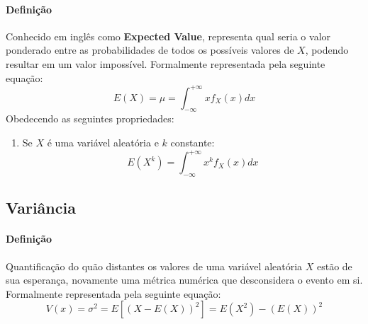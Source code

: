 \documentclass{article}
\begin{document}
            \paragraph{Definição}Conhecido em inglês como \textbf{Expected Value}, representa qual seria o valor ponderado entre as probabilidades de todos os possíveis valores de $X$, podendo resultar em um valor impossível. Formalmente representada pela seguinte equação:
                \begin{equation}
                    \boxed{
                        E(X) = \mu = 
                        \int_{-\infty}^{+\infty} x f_{X}(x) dx
                    }
                \end{equation}
            Obedecendo as seguintes propriedades:
                \begin{enumerate}[rightmargin = \leftmargin, noitemsep]
                    \item Se $X$ é uma variável aleatória e $k$ constante:
                        \begin{equation}
                            \boxed{
                                E(X^{k}) = 
                                \int_{-\infty}^{+\infty} x^{k} f_{X}(x) dx
                            }
                        \end{equation}
                \end{enumerate}

        \subsection{Variância}
            \paragraph{Definição}Quantificação do quão distantes os valores de uma variável aleatória $X$ estão de sua esperança, novamente uma métrica numérica que desconsidera o evento em si. Formalmente representada pela seguinte equação:
                \begin{equation}
                    \boxed{
                        V(x) = \sigma^{2} = 
                        E[(X - E(X))^{2}] =
                        E(X^{2}) - (E(X))^{2}
                    }
                \end{equation}
\end{document}
